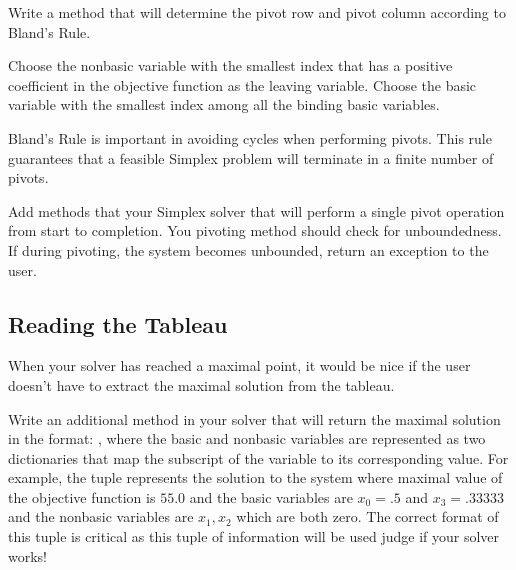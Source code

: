 \begin{problem}
Write a method that will determine the pivot row and pivot column according to Bland's Rule.
\begin{definition}
Choose the nonbasic variable with the smallest index that has a positive coefficient in the objective function
as the leaving variable.  Choose the basic variable with the smallest index among all the binding basic variables.
\end{definition}

Bland's Rule is important in avoiding cycles when performing pivots.
This rule guarantees that a feasible Simplex problem will terminate in a finite number of pivots.
\label{prob:blands}
\end{problem}

\begin{problem}
Add methods that your Simplex solver that will perform a single pivot operation from start to completion.
You pivoting method should check for unboundedness.
If during pivoting, the system becomes unbounded, return an exception to the user.
\end{problem}

\subsection{Reading the Tableau}
When your solver has reached a maximal point, it would be nice if the user doesn't have to extract the maximal solution from the tableau.

\begin{problem}
Write an additional method in your solver that will return the maximal solution in the format: , where the basic and nonbasic variables are represented as two dictionaries that map the subscript of the variable to its corresponding value.
For example, the tuple  represents the solution to the system
where maximal value of the objective function is $55.0$ and the
basic variables are $x_0=.5$ and $x_3=.33333$ and the nonbasic variables are $x_1, x_2$ which are both zero.
The correct format of this tuple is critical as this tuple of information will be used judge if your solver works!
\end{problem}


